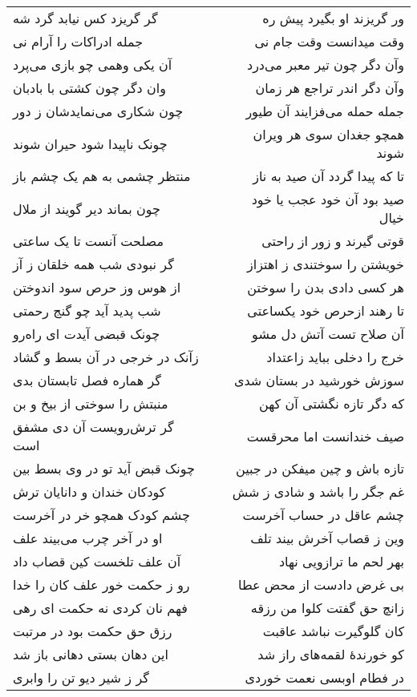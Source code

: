 \begin{center}
\begin{longtable}{l p{0.5cm} r}
گر گریزد کس نیابد گرد شه
&&
ور گریزند او بگیرد پیش ره
\\
جمله ادراکات را آرام نی
&&
وقت میدانست وقت جام نی
\\
آن یکی وهمی چو بازی می‌پرد
&&
وآن دگر چون تیر معبر می‌درد
\\
وان دگر چون کشتی با بادبان
&&
وآن دگر اندر تراجع هر زمان
\\
چون شکاری می‌نمایدشان ز دور
&&
جمله حمله می‌فزایند آن طیور
\\
چونک ناپیدا شود حیران شوند
&&
همچو جغدان سوی هر ویران شوند
\\
منتظر چشمی به هم یک چشم باز
&&
تا که پیدا گردد آن صید به ناز
\\
چون بماند دیر گویند از ملال
&&
صید بود آن خود عجب یا خود خیال
\\
مصلحت آنست تا یک ساعتی
&&
قوتی گیرند و زور از راحتی
\\
گر نبودی شب همه خلقان ز آز
&&
خویشتن را سوختندی ز اهتزاز
\\
از هوس وز حرص سود اندوختن
&&
هر کسی دادی بدن را سوختن
\\
شب پدید آید چو گنج رحمتی
&&
تا رهند ازحرص خود یکساعتی
\\
چونک قبضی آیدت ای راه‌رو
&&
آن صلاح تست آتش دل مشو
\\
زآنک در خرجی در آن بسط و گشاد
&&
خرج را دخلی بباید زاعتداد
\\
گر هماره فصل تابستان بدی
&&
سوزش خورشید در بستان شدی
\\
منبتش را سوختی از بیخ و بن
&&
که دگر تازه نگشتی آن کهن
\\
گر ترش‌رویست آن دی مشفق است
&&
صیف خندانست اما محرقست
\\
چونک قبض آید تو در وی بسط بین
&&
تازه باش و چین میفکن در جبین
\\
کودکان خندان و دانایان ترش
&&
غم جگر را باشد و شادی ز شش
\\
چشم کودک همچو خر در آخرست
&&
چشم عاقل در حساب آخرست
\\
او در آخر چرب می‌بیند علف
&&
وین ز قصاب آخرش بیند تلف
\\
آن علف تلخست کین قصاب داد
&&
بهر لحم ما ترازویی نهاد
\\
رو ز حکمت خور علف کان را خدا
&&
بی غرض دادست از محض عطا
\\
فهم نان کردی نه حکمت ای رهی
&&
زانچ حق گفتت کلوا من رزقه
\\
رزق حق حکمت بود در مرتبت
&&
کان گلوگیرت نباشد عاقبت
\\
این دهان بستی دهانی باز شد
&&
کو خورندهٔ لقمه‌های راز شد
\\
گر ز شیر دیو تن را وابری
&&
در فطام اوبسی نعمت خوردی

\end{longtable}
\end{center}
